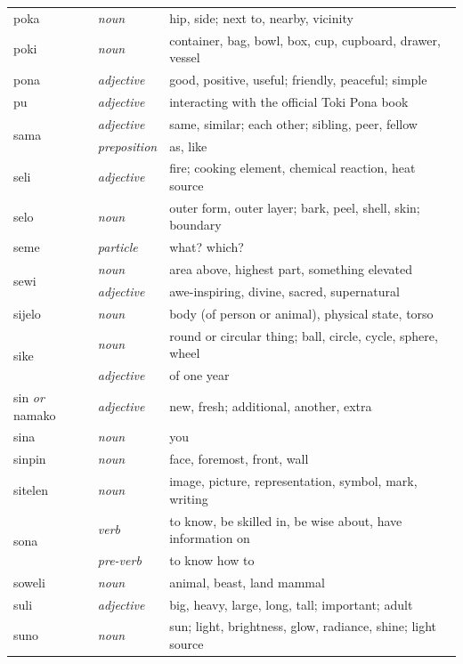 \documentclass[14pt, a4paper]{extreport}
\begin{document}
\begin{longtable}{llp{10cm}}
  poka & \textit{noun} & hip, side; next to, nearby, vicinity \\
  poki & \textit{noun} & container, bag, bowl, box, cup, cupboard, drawer, vessel \\
  pona & \textit{adjective} & good, positive, useful; friendly, peaceful; simple \\
  pu & \textit{adjective} & interacting with the official Toki Pona book \\
  \multirow[t]{2}{*}{sama} & \textit{adjective} & same, similar; each other; sibling, peer, fellow \\
  & \textit{preposition} & as, like \\
  seli & \textit{adjective} & fire; cooking element, chemical reaction, heat source \\
  selo & \textit{noun} & outer form, outer layer; bark, peel, shell, skin; boundary \\
  seme & \textit{particle} & what? which? \\
  \multirow[t]{2}{*}{sewi} & \textit{noun} & area above, highest part, something elevated \\
  & \textit{adjective} & awe-inspiring, divine, sacred, supernatural \\
  sijelo & \textit{noun} & body (of person or animal), physical state, torso \\
  \multirow[t]{2}{*}{sike} & \textit{noun} & round or circular thing; ball, circle, cycle, sphere, wheel \\
  & \textit{adjective} & of one year \\
  sin \textit{or} namako & \textit{adjective} & new, fresh; additional, another, extra \\
  sina & \textit{noun} & you \\
  sinpin & \textit{noun} & face, foremost, front, wall \\
  sitelen & \textit{noun} & image, picture, representation, symbol, mark, writing \\
  \multirow[t]{2}{*}{sona} & \textit{verb} & to know, be skilled in, be wise about, have information on \\
  & \textit{pre-verb} & to know how to \\
  soweli & \textit{noun} & animal, beast, land mammal \\
  suli & \textit{adjective} & big, heavy, large, long, tall; important; adult \\
  suno & \textit{noun} & sun; light, brightness, glow, radiance, shine; light source \\

\end{longtable}
\end{document}
